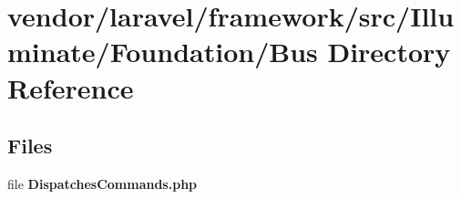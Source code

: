 \section{vendor/laravel/framework/src/\+Illuminate/\+Foundation/\+Bus Directory Reference}
\label{dir_c0e2bed1c641a7e47a1b455d7b53adf7}
\subsection*{Files}
\begin{DoxyCompactItemize}
\item 
file {\bf Dispatches\+Commands.\+php}
\end{DoxyCompactItemize}
